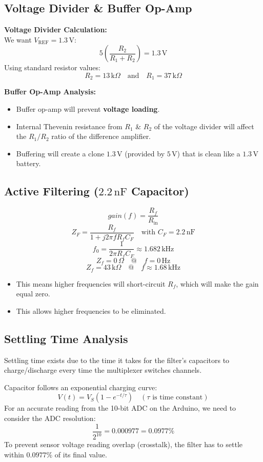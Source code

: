 \documentclass{article}
\begin{document}
\subsection{Voltage Divider \& Buffer Op-Amp}
\textbf{Voltage Divider Calculation:} \\
We want $V_{\text{REF}} = 1.3\,\text{V}$:
\[
5 \left( \frac{R_2}{R_1 + R_2} \right) = 1.3\,\text{V}
\]
Using standard resistor values:
\[
R_2 = 13\,\text{k}\Omega \quad \text{and} \quad R_1 = 37\,\text{k}\Omega
\]

\vspace{0.5em}
\noindent \textbf{Buffer Op-Amp Analysis:}
\begin{itemize}
    \item Buffer op-amp will prevent \textbf{voltage loading}.
    \item Internal Thevenin resistance from $R_1$ \& $R_2$ of the voltage divider will affect the $R_1 / R_2$ ratio of the difference amplifier.
    \item Buffering will create a clone $1.3\,\text{V}$ (provided by $5\,\text{V}$) that is clean like a $1.3\,\text{V}$ battery.
\end{itemize}


\subsection{Active Filtering ($2.2\,\text{nF}$ Capacitor)}
\[
gain(f) = \frac{R_f}{R_{\text{in}}}
\]
\[
Z_F = \frac{R_f}{1 + j 2 \pi f R_f C_F} \quad \text{with } C_F = 2.2\,\text{nF}
\]
\[
f_0 = \frac{1}{2 \pi R_f C_F} \approx 1.682\,\text{kHz}
\]
\[
Z_f = 0\,\Omega \quad @ \quad f = 0\,\text{Hz}
\]
\[
Z_f = 43\,\text{k}\Omega \quad @ \quad f \approx 1.68\,\text{kHz}
\]
\begin{itemize}
    \item This means higher frequencies will short-circuit $R_f$, which will make the gain equal zero.
    \item This allows higher frequencies to be eliminated.
\end{itemize}

\subsection{Settling Time Analysis}

Settling time exists due to the time it takes for the filter's capacitors to charge/discharge every time the multiplexer switches channels.

\noindent Capacitor follows an exponential charging curve:
\[
V(t) = V_S \left(1 - e^{-t/\tau}\right) \quad (\tau \text{ is time constant})
\]
For an accurate reading from the 10-bit ADC on the Arduino, we need to consider the ADC resolution:
\[
\frac{1}{2^{10}} = 0.000977 = 0.0977\%
\]
To prevent sensor voltage reading overlap (crosstalk), the filter has to settle within $0.0977\%$ of its final value.
\end{document}
